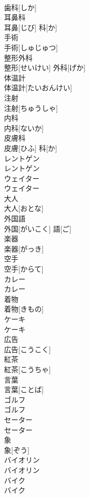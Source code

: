 \documentclass[8pt]{extreport}
\begin{document}
\begin{CJK}{UTF8}{min}
\\	歯科[しか]
\\	耳鼻科	
\\	耳鼻[じび] 科[か]
\\	手術	
\\	手術[しゅじゅつ]
\\	整形外科	
\\	整形[せいけい] 外科[げか]
\\	体温計	
\\	体温計[たいおんけい]
\\	注射	
\\	注射[ちゅうしゃ]
\\	内科	
\\	内科[ないか]
\\	皮膚科	
\\	皮膚[ひふ] 科[か]
\\	レントゲン	
\\	レントゲン
\\	ウェイター	
\\	ウェイター
\\	大人	
\\	大人[おとな]
\\	外国語	
\\	外国[がいこく] 語[ご]
\\	楽器	
\\	楽器[がっき]
\\	空手	
\\	空手[からて]
\\	カレー	
\\	カレー
\\	着物	
\\	着物[きもの]
\\	ケーキ	
\\	ケーキ
\\	広告	
\\	広告[こうこく]
\\	紅茶	
\\	紅茶[こうちゃ]
\\	言葉	
\\	言葉[ことば]
\\	ゴルフ	
\\	ゴルフ
\\	セーター	
\\	セーター
\\	象	
\\	象[ぞう]
\\	バイオリン	
\\	バイオリン
\\	バイク	
\\	バイク

\end{CJK}
\end{document}
